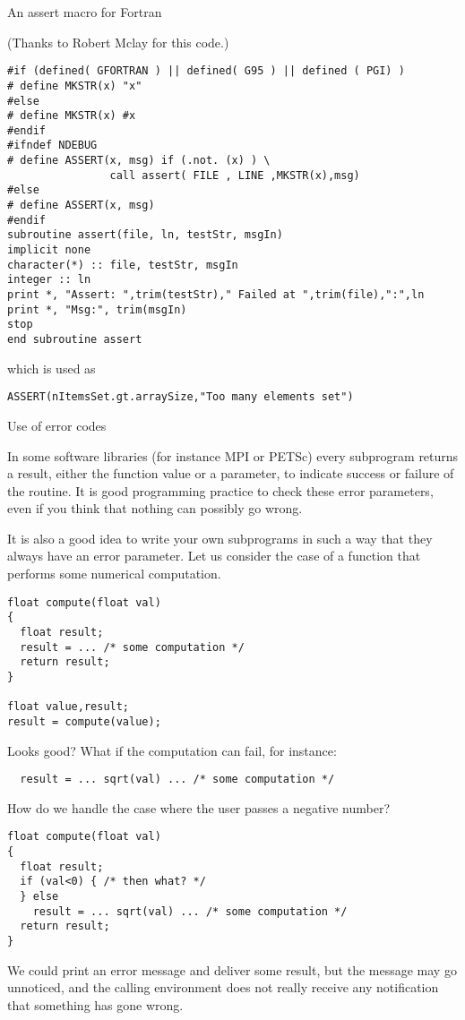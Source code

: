  {An assert macro for Fortran}

(Thanks to Robert Mclay for this code.)

\begin{verbatim}
#if (defined( GFORTRAN ) || defined( G95 ) || defined ( PGI) )
# define MKSTR(x) "x"
#else
# define MKSTR(x) #x
#endif
#ifndef NDEBUG
# define ASSERT(x, msg) if (.not. (x) ) \
                call assert( FILE , LINE ,MKSTR(x),msg)
#else
# define ASSERT(x, msg)
#endif
subroutine assert(file, ln, testStr, msgIn)
implicit none
character(*) :: file, testStr, msgIn
integer :: ln
print *, "Assert: ",trim(testStr)," Failed at ",trim(file),":",ln
print *, "Msg:", trim(msgIn)
stop
end subroutine assert
\end{verbatim}
which is used as
\begin{verbatim}
ASSERT(nItemsSet.gt.arraySize,"Too many elements set")
\end{verbatim}


 {Use of error codes}

In some software libraries (for instance MPI or PETSc) every subprogram
returns a result, either the function value or a parameter, to
indicate success or failure of the routine. It is good programming
practice to check these error parameters, even if you think that
nothing can possibly go wrong.

It is also a good idea to write your own subprograms in such a way
that they always have an error parameter. Let us consider the case of
a function that performs some numerical computation.

\begin{verbatim}
float compute(float val)
{
  float result;
  result = ... /* some computation */
  return result;
}

float value,result;
result = compute(value);
\end{verbatim}
Looks good? What if the computation can fail, for instance:
\begin{verbatim}
  result = ... sqrt(val) ... /* some computation */
\end{verbatim}
How do we handle the case where the user passes a negative number?
\begin{verbatim}
float compute(float val)
{
  float result;
  if (val<0) { /* then what? */ 
  } else 
    result = ... sqrt(val) ... /* some computation */
  return result;
}
\end{verbatim}
We could print an error message and deliver some result, but the
message may go unnoticed, and the calling environment does not really
receive any notification that something has gone wrong.

